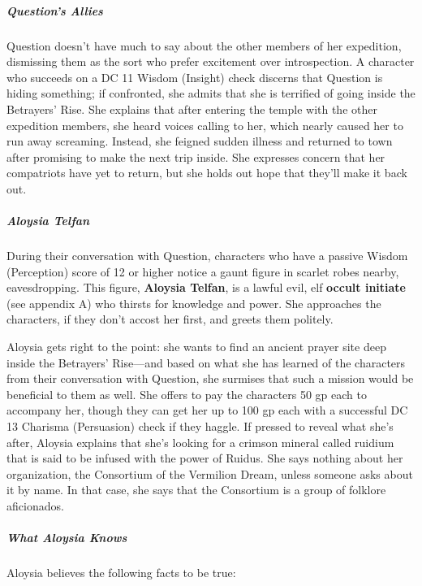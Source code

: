 \documentclass[10pt,a4paper,twoside,fancy,bg=print,twocolumn,openany,nodeprecatedcode]{dndbook}
\begin{document}
\subparagraph{Question's Allies}
Question doesn't have much to say about the other members of her expedition, dismissing them as the sort who prefer excitement over introspection. A character who succeeds on a DC 11 Wisdom (Insight) check discerns that Question is hiding something; if confronted, she admits that she is terrified of going inside the Betrayers' Rise. She explains that after entering the temple with the other expedition members, she heard voices calling to her, which nearly caused her to run away screaming. Instead, she feigned sudden illness and returned to town after promising to make the next trip inside. She expresses concern that her compatriots have yet to return, but she holds out hope that they'll make it back out.

\subparagraph{Aloysia Telfan}
During their conversation with Question, characters who have a passive Wisdom (Perception) score of 12 or higher notice a gaunt figure in scarlet robes nearby, eavesdropping. This figure, \textbf{Aloysia Telfan}, is a lawful evil, elf \textbf{occult initiate} (see appendix A) who thirsts for knowledge and power. She approaches the characters, if they don't accost her first, and greets them politely.

Aloysia gets right to the point: she wants to find an ancient prayer site deep inside the Betrayers' Rise—and based on what she has learned of the characters from their conversation with Question, she surmises that such a mission would be beneficial to them as well. She offers to pay the characters 50 gp each to accompany her, though they can get her up to 100 gp each with a successful DC 13 Charisma (Persuasion) check if they haggle. If pressed to reveal what she's after, Aloysia explains that she's looking for a crimson mineral called ruidium that is said to be infused with the power of Ruidus. She says nothing about her organization, the Consortium of the Vermilion Dream, unless someone asks about it by name. In that case, she says that the Consortium is a group of folklore aficionados.

\subparagraph{What Aloysia Knows}
Aloysia believes the following facts to be true:
\end{document}
